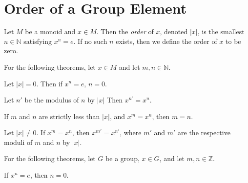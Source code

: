 \section{Order of a Group Element}

\begin{definition}
    \label{definition : order}
    \leanok
    Let $M$ be a monoid and $x \in M$. Then the \textit{order} of $x$, denoted $|x|$, is the smallest $n \in \mathbb{N}$ satisfying $x^n = e$. If no such $n$ exists, then we define the order of $x$ to be zero.
\end{definition}

For the following theorems, let $x \in M$ and let $m,n \in \mathbb{N}$.

\begin{theorem}
    \label{theorem : mpow_order_zero}
    \leanok
    Let $|x| = 0$. Then if $x^n = e$, $n = 0$.
\end{theorem}

\begin{theorem}
    \label{theorem : mpow_mod_order}
    \leanok
    Let $n'$ be the modulus of $n$ by $|x|$ Then $x^{n'} = x^n$.
\end{theorem}

\begin{lemma}
    \label{theorem : mpow_inj_of_lt_order}
    \leanok
    If $m$ and $n$ are strictly less than $|x|$, and $x^m = x^n$, then $m = n$.
\end{lemma}

\begin{theorem}
    \label{theorem : mod_order_eq_of_mpow_eq}
    \leanok
    Let $|x| \ne 0$. If $x^m = x^n$, then $x^{m'} = x^{n'}$, where $m'$ and $m'$ are the respective moduli of $m$ and $n$ by $|x|$.
\end{theorem}

For the following theorems, let $G$ be a group, $x \in G$, and let $m,n \in \mathbb{Z}$.

\begin{theorem}
    \label{theorem : gpow_order}
    \leanok
    If $x^n = e$, then $n = 0$.
\end{theorem}

